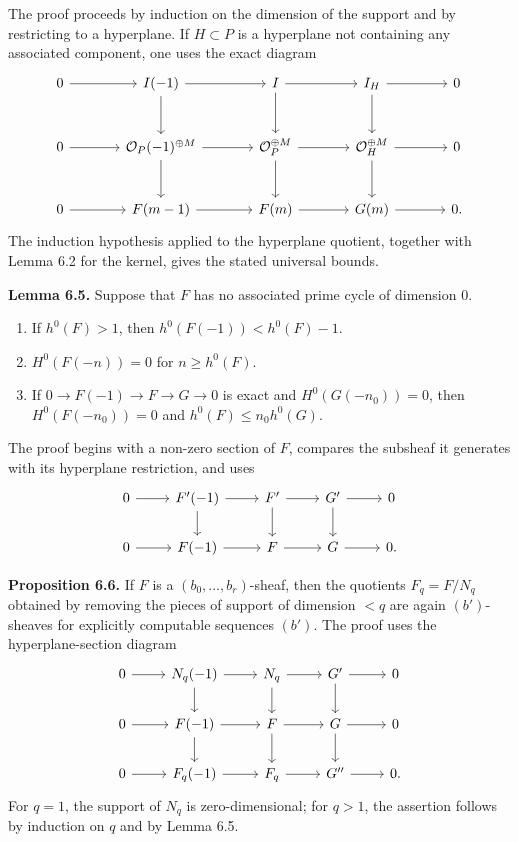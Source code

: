 \documentclass[11pt]{article}
\begin{document}
The proof proceeds by induction on the dimension of the support and by restricting to a hyperplane. If $H\subset P$ is a hyperplane not containing any associated component, one uses the exact diagram
\[
\begin{tikzcd}[column sep=large,row sep=large]
0 \arrow[r] & I(-1) \arrow[r] \arrow[d] & I \arrow[r] \arrow[d] & I_H \arrow[r] \arrow[d] & 0 \\
0 \arrow[r] & \mathcal O_P(-1)^{\oplus M} \arrow[r] \arrow[d] & \mathcal O_P^{\oplus M} \arrow[r] \arrow[d] & \mathcal O_H^{\oplus M} \arrow[r] \arrow[d] & 0 \\
0 \arrow[r] & F(m-1) \arrow[r] & F(m) \arrow[r] & G(m) \arrow[r] & 0 .
\end{tikzcd}
\]
The induction hypothesis applied to the hyperplane quotient, together with Lemma 6.2 for the kernel, gives the stated universal bounds.

\textbf{Lemma 6.5.} Suppose that $F$ has no associated prime cycle of dimension $0$.
\begin{enumerate}[label=\roman*)]
\item If $h^0(F)>1$, then $h^0(F(-1))<h^0(F)-1$.
\item $H^0(F(-n))=0$ for $n\ge h^0(F)$.
\item If $0\to F(-1)\to F\to G\to0$ is exact and $H^0(G(-n_0))=0$, then $H^0(F(-n_0))=0$ and $h^0(F)\le n_0h^0(G)$.
\end{enumerate}
The proof begins with a non-zero section of $F$, compares the subsheaf it generates with its hyperplane restriction, and uses
\[
\begin{tikzcd}
0 \arrow[r] & F'(-1) \arrow[r] \arrow[d] & F' \arrow[r] \arrow[d] & G' \arrow[r] \arrow[d] & 0 \\
0 \arrow[r] & F(-1) \arrow[r] & F \arrow[r] & G \arrow[r] & 0 .
\end{tikzcd}
\]

\textbf{Proposition 6.6.} If $F$ is a $(b_0,\ldots,b_r)$-sheaf, then the quotients $F_q=F/N_q$ obtained by removing the pieces of support of dimension $<q$ are again $(b')$-sheaves for explicitly computable sequences $(b')$. The proof uses the hyperplane-section diagram
\[
\begin{tikzcd}
0 \arrow[r] & N_q(-1) \arrow[r] \arrow[d] & N_q \arrow[r] \arrow[d] & G' \arrow[r] \arrow[d] & 0 \\
0 \arrow[r] & F(-1) \arrow[r] \arrow[d] & F \arrow[r] \arrow[d] & G \arrow[r] \arrow[d] & 0 \\
0 \arrow[r] & F_q(-1) \arrow[r] & F_q \arrow[r] & G'' \arrow[r] & 0 .
\end{tikzcd}
\]
For $q=1$, the support of $N_q$ is zero-dimensional; for $q>1$, the assertion follows by induction on $q$ and by Lemma 6.5.
\end{document}
